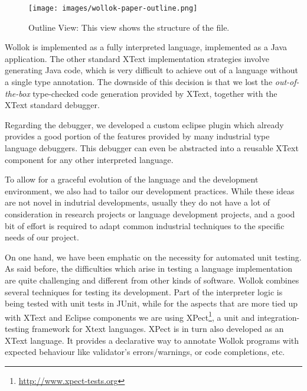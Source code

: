 \begin{figure}[ht]
    \centering
	\texttt{[image: images/wollok-paper-outline.png]}
    \caption{Outline View: This view shows the structure of the file.}
    \label{fig:outline.png}
\end{figure}

Wollok is implemented as a fully interpreted language, implemented as a Java application. 
The other standard XText implementation strategies involve generating Java code, which is very difficult to achieve out of a language without a single type annotation.
The downside of this decision is that we lost the \emph{out-of-the-box} type-checked code generation provided by XText, together with the XText standard debugger.

Regarding the debugger, we developed a custom eclipse plugin which already provides a good portion of the features provided by many industrial type language debuggers.
This debugger can even be abstracted into a reusable XText component for any other interpreted language.


\medskip
To allow for a graceful evolution of the language and the development environment, we also had to tailor our development practices.
While these ideas are not novel in indutrial developments, usually they do not have a lot of consideration in research projects or language development projects,
and a good bit of effort is required to adapt common industrial techniques to the specific needs of our project.

On one hand, we have been emphatic on the necessity for automated unit testing.
As said before, the difficulties which arise in testing a language implementation are quite challenging and different from other kinds of software.
Wollok combines several techniques for testing its development.
Part of the interpreter logic is being tested with unit tests in JUnit, 
while for the aspects that are more tied up with XText and Eclipse components we are using XPect\footnote{\url{http://www.xpect-tests.org}}, 
a unit and integration-testing framework for Xtext languages.
XPect is in turn also developed as an XText language.
It provides a declarative way to annotate Wollok programs with expected behaviour like validator’s errors/warnings, or code completions, etc.

